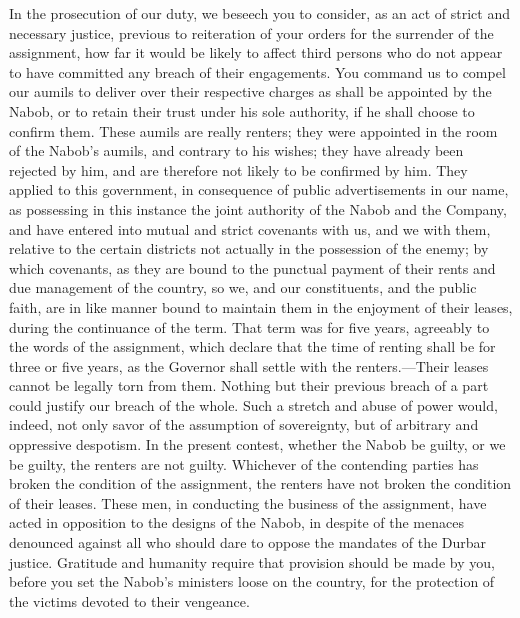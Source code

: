 In the prosecution of our duty, we beseech you to consider, as an act of strict and necessary justice, previous to reiteration of your orders for the surrender of the assignment, how far it would be likely to affect third persons who do not appear to have committed any breach of their engagements. You command us to compel our aumils to deliver over their respective charges as shall be appointed by the Nabob, or to retain their trust under his sole authority, if he shall choose to confirm them. These aumils are really renters; they were appointed in the room of the Nabob's aumils, and contrary to his wishes; they have already been rejected by him, and are therefore not likely to be confirmed by him. They applied to this government, in consequence of public advertisements in our name, as possessing in this instance the joint authority of the Nabob and the Company, and have entered into mutual and strict covenants with us, and we with them, relative to the certain districts not actually in the possession of the enemy; by which covenants, as they are bound to the punctual payment of their rents and due management of the country, so we, and our constituents, and the public faith, are in like manner bound to maintain them in the enjoyment of their leases, during the continuance of the term. That term was for five years, agreeably to the words of the assignment, which declare that the time of renting shall be for three or five years, as the Governor shall settle with the renters.—Their leases cannot be legally torn from them. Nothing but their previous breach of a part could justify our breach of the whole. Such a stretch and abuse of power would, indeed, not only savor of the assumption of sovereignty, but of arbitrary and oppressive despotism. In the present contest, whether the Nabob be guilty, or we be guilty, the renters are not guilty. Whichever of the contending parties has broken the condition of the assignment, the renters have not broken the condition of their leases. These men, in conducting the business of the assignment, have acted in opposition to the designs of the Nabob, in despite of the menaces denounced against all who should dare to oppose the mandates of the Durbar justice. Gratitude and humanity require that provision should be made by you, before you set the Nabob's ministers loose on the country, for the protection of the victims devoted to their vengeance.

